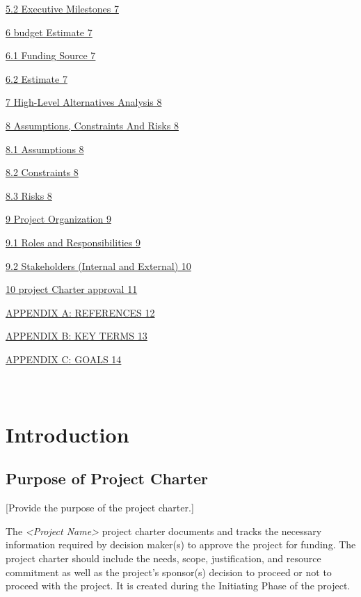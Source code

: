 \protect\hyperlink{executive-milestones}{5.2 Executive Milestones 7}

\protect\hyperlink{budget-estimate}{6 budget Estimate 7}

\protect\hyperlink{funding-source}{6.1 Funding Source 7}

\protect\hyperlink{estimate}{6.2 Estimate 7}

\protect\hyperlink{high-level-alternatives-analysis}{7 High-Level
Alternatives Analysis 8}

\protect\hyperlink{assumptions-constraints-and-risks}{8 Assumptions,
Constraints And Risks 8}

\protect\hyperlink{assumptions}{8.1 Assumptions 8}

\protect\hyperlink{constraints}{8.2 Constraints 8}

\protect\hyperlink{risks}{8.3 Risks 8}

\protect\hyperlink{project-organization}{9 Project Organization 9}

\protect\hyperlink{roles-and-responsibilities}{9.1 Roles and
Responsibilities 9}

\protect\hyperlink{stakeholders-internal-and-external}{9.2 Stakeholders
(Internal and External) 10}

\protect\hyperlink{project-charter-approval}{10 project Charter approval
11}

\protect\hyperlink{_Toc107027580}{APPENDIX A: REFERENCES 12}

\protect\hyperlink{_Toc106079534}{APPENDIX B: KEY TERMS 13}

\protect\hyperlink{_Toc141159352}{APPENDIX C: GOALS 14}

\hypertarget{introduction}{%
\section{\texorpdfstring{\\
Introduction}{ Introduction}}\label{introduction}}

\hypertarget{purpose-of-project-charter}{%
\subsection{Purpose of Project
Charter}\label{purpose-of-project-charter}}

{[}Provide the purpose of the project charter.{]}

The \emph{\textless{}Project Name\textgreater{}} project charter
documents and tracks the necessary information required by decision
maker(s) to approve the project for funding. The project charter should
include the needs, scope, justification, and resource commitment as well
as the project's sponsor(s) decision to proceed or not to proceed with
the project. It is created during the Initiating Phase of the project.

